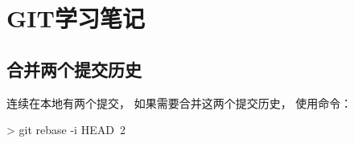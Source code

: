 \section{GIT学习笔记}
\subsection{合并两个提交历史}
连续在本地有两个提交， 如果需要合并这两个提交历史， 使用命令：
\begin{cmd}
 > git rebase -i HEAD~2
\end{cmd}


